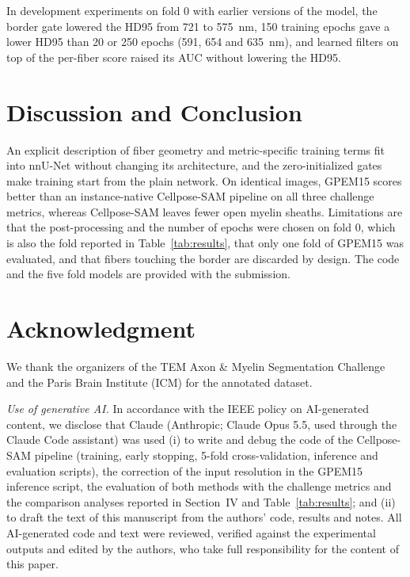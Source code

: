 \documentclass[journal]{IEEEtran}
\begin{document}
In development experiments on fold 0 with earlier versions of the model, the
border gate lowered the HD95 from 721 to 575~nm, 150 training epochs gave a
lower HD95 than 20 or 250 epochs (591, 654 and 635~nm), and learned filters on
top of the per-fiber score raised its AUC without lowering the HD95.

\section{Discussion and Conclusion}

An explicit description of fiber geometry and metric-specific training terms
fit into nnU-Net without changing its architecture, and the zero-initialized
gates make training start from the plain network. On identical images,
GPEM15 scores better than an instance-native Cellpose-SAM pipeline on all
three challenge metrics, whereas Cellpose-SAM leaves fewer open myelin sheaths.
Limitations are that the post-processing and the number of epochs were chosen on
fold 0, which is also the fold reported in Table~\ref{tab:results}, that only
one fold of GPEM15 was evaluated, and that fibers touching the border are
discarded by design. The code and the five fold
models are provided with the submission.

\section*{Acknowledgment}
We thank the organizers of the TEM Axon \& Myelin Segmentation Challenge and the
Paris Brain Institute (ICM) for the annotated dataset.

\textit{Use of generative AI.} In accordance with the IEEE policy on
AI-generated content, we disclose that Claude (Anthropic; Claude Opus 5.5,
used through the Claude Code assistant) was used (i) to write and debug the
code of the Cellpose-SAM pipeline (training, early stopping, 5-fold
cross-validation, inference and evaluation scripts), the correction of the
input resolution in the GPEM15 inference script, the evaluation of both
methods with the challenge metrics and the comparison analyses reported in
Section~IV and Table~\ref{tab:results}; and (ii) to draft the text of this
manuscript from the authors' code, results and notes. %
All AI-generated code and text were reviewed, verified against the
experimental outputs and edited by the authors, who take full responsibility
for the content of this paper.



\end{document}
